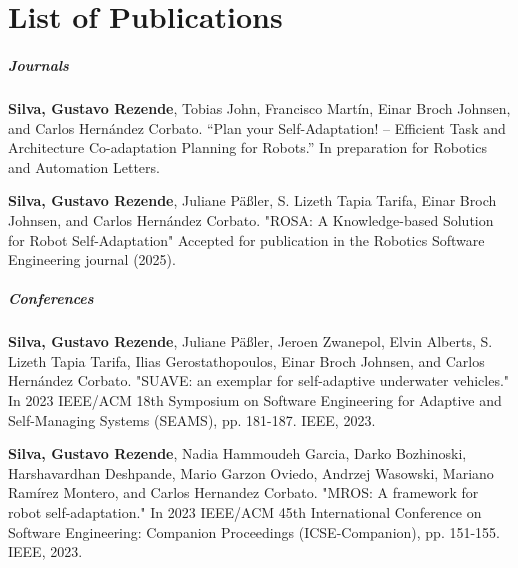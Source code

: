 \chapter*{List of Publications}
\label{publications}


\paragraph{Journals}

\begin{etaremune}{\small
 \item[{\faFileLines[regular]}~~1.] \textbf{Silva, Gustavo Rezende}, Tobias John, Francisco Martín, Einar Broch Johnsen, and Carlos Hern{\'a}ndez Corbato. ``Plan your Self-Adaptation! -- Efficient Task and Architecture Co-adaptation Planning for Robots.'' In preparation for Robotics and Automation Letters.
\item[{\faFileLines[regular]}~~2.] \textbf{Silva, Gustavo Rezende}, Juliane Päßler, S. Lizeth Tapia Tarifa, Einar Broch Johnsen, and Carlos Hernández Corbato. "ROSA: A Knowledge-based Solution for Robot Self-Adaptation" Accepted for publication in the Robotics Software Engineering journal (2025).
}
\end{etaremune}

\paragraph{Conferences}

\begin{etaremune}{\small
  \item[{\faFileLines[regular]}~~1.] \textbf{Silva, Gustavo Rezende}, Juliane Päßler, Jeroen Zwanepol, Elvin Alberts, S. Lizeth Tapia Tarifa, Ilias Gerostathopoulos, Einar Broch Johnsen, and Carlos Hernández Corbato. "SUAVE: an exemplar for self-adaptive underwater vehicles." In 2023 IEEE/ACM 18th Symposium on Software Engineering for Adaptive and Self-Managing Systems (SEAMS), pp. 181-187. IEEE, 2023.
  \item[2.] \textbf{Silva, Gustavo Rezende}, Nadia Hammoudeh Garcia, Darko Bozhinoski, Harshavardhan Deshpande, Mario Garzon Oviedo, Andrzej Wasowski, Mariano Ramírez Montero, and Carlos Hernandez Corbato. "MROS: A framework for robot self-adaptation." In 2023 IEEE/ACM 45th International Conference on Software Engineering: Companion Proceedings (ICSE-Companion), pp. 151-155. IEEE, 2023.
}
\end{etaremune}


